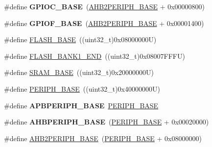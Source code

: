 \begin{DoxyCompactItemize}
\mbox{\label{group___peripheral__memory__map_ga26f267dc35338eef219544c51f1e6b3f}} 
\#define {\bfseries G\+P\+I\+O\+C\+\_\+\+B\+A\+SE}~(\hyperlink{group___peripheral__memory__map_gaeedaa71d22a1948492365e2cd26cfd46}{A\+H\+B2\+P\+E\+R\+I\+P\+H\+\_\+\+B\+A\+SE} + 0x00000800)
\item 
\mbox{\label{group___peripheral__memory__map_ga7f9a3f4223a1a784af464a114978d26e}} 
\#define {\bfseries G\+P\+I\+O\+F\+\_\+\+B\+A\+SE}~(\hyperlink{group___peripheral__memory__map_gaeedaa71d22a1948492365e2cd26cfd46}{A\+H\+B2\+P\+E\+R\+I\+P\+H\+\_\+\+B\+A\+SE} + 0x00001400)
\item 
\#define \hyperlink{group___peripheral__memory__map_ga23a9099a5f8fc9c6e253c0eecb2be8db}{F\+L\+A\+S\+H\+\_\+\+B\+A\+SE}~((uint32\+\_\+t)0x08000000\+U)
\item 
\#define \hyperlink{group___peripheral__memory__map_ga443a2786535d83e32dfdc2b29e379332}{F\+L\+A\+S\+H\+\_\+\+B\+A\+N\+K1\+\_\+\+E\+ND}~((uint32\+\_\+t)0x08007\+F\+F\+F\+U)
\item 
\#define \hyperlink{group___peripheral__memory__map_ga05e8f3d2e5868754a7cd88614955aecc}{S\+R\+A\+M\+\_\+\+B\+A\+SE}~((uint32\+\_\+t)0x20000000\+U)
\item 
\#define \hyperlink{group___peripheral__memory__map_ga9171f49478fa86d932f89e78e73b88b0}{P\+E\+R\+I\+P\+H\+\_\+\+B\+A\+SE}~((uint32\+\_\+t)0x40000000\+U)
\item 
\mbox{\label{group___peripheral__memory__map_gac85f31889eb6a3f651b563bbc7131f91}} 
\#define {\bfseries A\+P\+B\+P\+E\+R\+I\+P\+H\+\_\+\+B\+A\+SE}~\hyperlink{group___peripheral__memory__map_ga9171f49478fa86d932f89e78e73b88b0}{P\+E\+R\+I\+P\+H\+\_\+\+B\+A\+SE}
\item 
\mbox{\label{group___peripheral__memory__map_ga92eb5d49730765d2abd0f5b09548f9f5}} 
\#define {\bfseries A\+H\+B\+P\+E\+R\+I\+P\+H\+\_\+\+B\+A\+SE}~(\hyperlink{group___peripheral__memory__map_ga9171f49478fa86d932f89e78e73b88b0}{P\+E\+R\+I\+P\+H\+\_\+\+B\+A\+SE} + 0x00020000)
\item 
\#define \hyperlink{group___peripheral__memory__map_gaeedaa71d22a1948492365e2cd26cfd46}{A\+H\+B2\+P\+E\+R\+I\+P\+H\+\_\+\+B\+A\+SE}~(\hyperlink{group___peripheral__memory__map_ga9171f49478fa86d932f89e78e73b88b0}{P\+E\+R\+I\+P\+H\+\_\+\+B\+A\+SE} + 0x08000000)

\end{DoxyCompactItemize}
